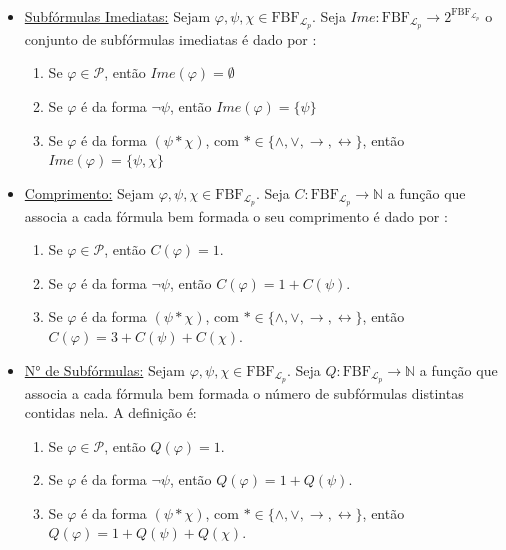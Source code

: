 \begin{itemize}[left=0.5cm, align=left, nosep]
            \item \underline{Subfórmulas Imediatas:} Sejam $\varphi,\psi,\chi \in \mathrm{FBF}_{\mathcal{L}_p}$. Seja $Ime: 
            \mathrm{FBF}_{\mathcal{L}_p} \rightarrow 2^{\mathrm{FBF}_{\mathcal{L}_p}}$ o conjunto de subfórmulas imediatas 
            é dado por : 

            \begin{enumerate}[left=0.5cm, align=left, nosep]
                \item Se $\varphi \in \mathcal{P}$, então $Ime(\varphi) = \emptyset$  
                \item Se $\varphi$ é da forma $\neg \psi$, então $Ime(\varphi) = \{ \psi \}$ 
                \item Se $\varphi$ é da forma $(\psi * \chi)$, com $* \in \{\wedge, \vee, \rightarrow, \leftrightarrow\}$, então $Ime(\varphi) = \{ \psi,\chi \}$
            \end{enumerate}

            \item \underline{Comprimento:} Sejam $\varphi,\psi,\chi \in \mathrm{FBF}_{\mathcal{L}_p}$. Seja $C: 
            \mathrm{FBF}_{\mathcal{L}_p} \rightarrow \mathbb{N}$ a função que associa a cada fórmula bem formada o seu 
            comprimento é dado por :  

            \begin{enumerate}[left=0.5cm, align=left, nosep] 
                \item Se $\varphi \in \mathcal{P}$, então $C(\varphi) = 1$. 
                \item Se $\varphi$ é da forma $\neg \psi$, então $C(\varphi) = 1 + C(\psi)$. 
                \item Se $\varphi$ é da forma $(\psi * \chi)$, com $* \in \{\wedge, \vee, \rightarrow, \leftrightarrow\}$, então $C(\varphi) = 3 + C(\psi) + C(\chi)$. 
            \end{enumerate}

            \item \underline{N° de Subfórmulas:} Sejam $\varphi,\psi,\chi \in \mathrm{FBF}_{\mathcal{L}_p}$. Seja $Q: 
            \mathrm{FBF}_{\mathcal{L}_p} \rightarrow \mathbb{N}$ a função que associa a cada fórmula bem formada o número de 
            subfórmulas distintas contidas nela. A definição é:
        
            \begin{enumerate}[left=0.5cm, align=left, nosep] 
                \item Se $\varphi \in \mathcal{P}$, então $Q(\varphi) = 1$. 
                \item Se $\varphi$ é da forma $\neg \psi$, então $Q(\varphi) = 1 + Q(\psi)$. 
                \item Se $\varphi$ é da forma $(\psi * \chi)$, com $* \in \{\wedge, \vee, \rightarrow, \leftrightarrow\}$, então $Q(\varphi) = 1 + Q(\psi) + Q(\chi)$. 
            \end{enumerate}


\end{itemize}
